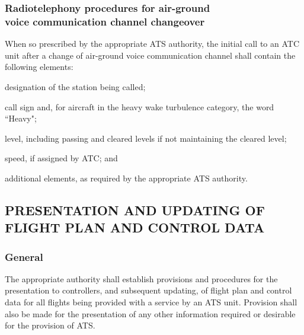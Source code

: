 \documentclass[../vATM.tex]{subfiles}
\begin{document}
    \subsubsection[Radiotelephony procedures for air-ground voice communication channel changeover]{Radiotelephony procedures for air-ground \\ voice communication channel changeover} \label{4.11.3}

    When so prescribed by the appropriate ATS authority, the initial call to an ATC unit after a change of air-ground voice communication channel shall contain the following elements:
    
    \begin{enumalph}
        \item designation of the station being called;
        \item call sign and, for aircraft in the heavy wake turbulence category, the word ``Heavy";
        \item level, including passing and cleared levels if not maintaining the cleared level;
        \item speed, if assigned by ATC; and
        \item additional elements, as required by the appropriate ATS authority.
    \end{enumalph}



    \subsection[Presentation and updating of flight plan and control data]{PRESENTATION AND UPDATING OF \\ FLIGHT PLAN AND CONTROL DATA}

    \subsubsection{General}

    The appropriate authority shall establish provisions and procedures for the presentation to controllers, and subsequent updating, of flight plan and control data for all flights being provided with a service by an ATS unit. Provision shall also be made for the presentation of any other information required or desirable for the provision of ATS.
\end{document}
